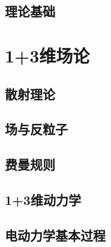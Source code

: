 \documentclass[
  a4paper,
  11pt,
  oneside
]{book}
\begin{document}

%

%


\chapter{理论基础}

\part{1+3维场论}%
\chapter{散射理论}\label{chap:scattering}

\chapter{场与反粒子}\label{chap:fields}

\chapter{费曼规则}

\chapter{1+3维动力学}
 
\chapter{电动力学基本过程}

\end{document}
